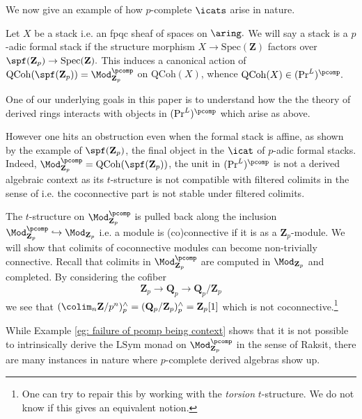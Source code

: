 \documentclass[10pt,reqno]{amsart}
\numberwithin{equation}{section}
\newcommand{\ZZ}{\mathbf{Z}}
\newcommand{\QQ}{\mathbf{Q}}
\newcommand{\spec}{{\mathrm{Spec}}}
\newcommand{\Qcoh}{\mathrm{QCoh}}
\newcommand{\Sym}{\mathrm{Sym}}
\renewcommand{\L}{\mathrm{L}}
\newcommand{\into}{\hookrightarrow}
\begin{document}
We now give an example of how $p$-complete $\icats$ arise in nature. 

\begin{example}\label{eg: pcomp cats as qcoh on stacks}
Let $X$ be a stack i.e. an fpqc sheaf of spaces on $\aring.$ We will say a stack is a $p$-adic formal stack if the structure morphism $X\to \spec(\ZZ)$ factors over $\spf(\ZZ_p)\to \spec(\ZZ).$ This induces a canonical action of $\Qcoh(\spf(\ZZ_p))=\Mod_{\ZZ_p}^{\pcomp}$ on $\Qcoh(X)$, whence $\Qcoh(X)\in (\Pr^L)^\pcomp.$ 
\end{example}

One of our underlying goals in this paper is to understand how the the theory of derived rings interacts with objects in $(\Pr^L)^\pcomp$ which arise as above. 

However one hits an obstruction even when the formal stack is affine, as shown by the example of  $\spf(\ZZ_p)$, the final object in the $\icat$ of $p$-adic formal stacks.
Indeed, $\Mod_{\ZZ_p}^\pcomp=\Qcoh(\spf(\ZZ_p))$, the unit in $(\Pr^L)^\pcomp$ is not a derived algebraic context as its $t$-structure is not compatible with filtered colimits in the sense of \cite[Definition 1.3.5.20]{HA} i.e. the coconnective part is not stable under filtered colimits.

\begin{example}\label{eg: failure of pcomp being context}
The $t$-structure on $\Mod_{\ZZ_p}^\pcomp$ is pulled back along the inclusion $\Mod_{\ZZ_p}^\pcomp\into \Mod_{\ZZ_p}$ i.e. a module is (co)connective if it is as a $\ZZ_p$-module. We will show that colimits of coconnective modules can become non-trivially connective.
Recall that colimits in $\Mod_{\ZZ_p}^\pcomp$ are computed in $\Mod_{\ZZ_p}$ and completed. By considering the cofiber 
$$\ZZ_p\to \QQ_p\to \QQ_p/\ZZ_p$$ we see that $(\colim_n \ZZ/p^n)^{\wedge}_p=(\QQ_p/\ZZ_p)^{\wedge}_p=\ZZ_p[1]$ which is not coconnective.\footnote{One can try to repair this by working with the \emph{torsion} $t$-structure. We do not know if this gives an equivalent notion.}
\end{example}

While Example \ref{eg: failure of pcomp being context} shows that it is not possible to intrinsically derive the $\L\Sym$ monad on $\Mod_{\ZZ_p}^{\pcomp}$ in the sense of Raksit, there are many instances in nature where $p$-complete derived algebras show up. 
\end{document}
